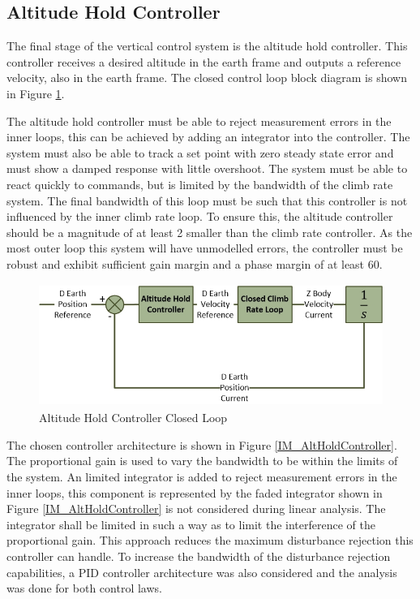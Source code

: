 	 \subsection{Altitude Hold Controller}
	 The final stage of the vertical control system is the altitude hold controller. This controller receives a desired altitude in the earth frame and outputs a reference velocity, also in the earth frame. The closed control loop block diagram is shown in Figure \ref{IM_AltHoldControlLoop}. 
	 
	 The altitude hold controller must be able to reject measurement errors in the inner loops, this can be achieved by adding an integrator into the controller. The system must also be able to track a set point with zero steady state error and must show a damped response with little overshoot. The system must be able to react quickly to commands, but is limited by the bandwidth of the climb rate system. The final bandwidth of this loop must be such that this controller is not influenced by the inner climb rate loop. To ensure this, the altitude controller should be a magnitude of at least 2 smaller than the climb rate controller. As the most outer loop this system will have unmodelled errors, the controller must be robust and exhibit sufficient gain margin and a phase margin of at least $60$\textdegree.
	 
	 \begin{figure}[H]
	 	\centering
	 	\includegraphics[height = 4cm]{../References/Diagrams/AltHoldLoop.jpg}
	 	\caption{Altitude Hold Controller Closed Loop}
	 	\label{IM_AltHoldControlLoop}
	 \end{figure}
	 
	 The chosen controller architecture is shown in Figure \ref{IM_AltHoldController}. The proportional gain is used to vary the bandwidth to be within the limits of the system. An limited integrator is added to reject measurement errors in the inner loops, this component is represented by the faded integrator shown in Figure \ref{IM_AltHoldController} is not considered during linear analysis. The integrator shall be limited in such a way as to limit the interference of the proportional gain. This approach reduces the maximum disturbance rejection this controller can handle. To increase the bandwidth of the disturbance rejection capabilities, a PID controller architecture was also considered and the analysis was done for both control laws.
	 
